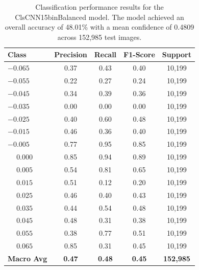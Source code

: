 \begin{table}[htbp]
\centering
\begin{tabular}{@{}lcccc@{}}
\toprule
\textbf{Class} & \textbf{Precision} & \textbf{Recall} & \textbf{F1-Score} & \textbf{Support} \\
\midrule
$-0.065$ & 0.37 & 0.43 & 0.40 & 10,199 \\
$-0.055$ & 0.22 & 0.27 & 0.24 & 10,199 \\
$-0.045$ & 0.34 & 0.39 & 0.36 & 10,199 \\
$-0.035$ & 0.00 & 0.00 & 0.00 & 10,199 \\
$-0.025$ & 0.40 & 0.60 & 0.48 & 10,199 \\
$-0.015$ & 0.46 & 0.36 & 0.40 & 10,199 \\
$-0.005$ & 0.77 & 0.95 & 0.85 & 10,199 \\
$\phantom{-}0.000$ & 0.85 & 0.94 & 0.89 & 10,199 \\
$\phantom{-}0.005$ & 0.54 & 0.81 & 0.65 & 10,199 \\
$\phantom{-}0.015$ & 0.51 & 0.12 & 0.20 & 10,199 \\
$\phantom{-}0.025$ & 0.46 & 0.40 & 0.43 & 10,199 \\
$\phantom{-}0.035$ & 0.44 & 0.54 & 0.48 & 10,199 \\
$\phantom{-}0.045$ & 0.48 & 0.31 & 0.38 & 10,199 \\
$\phantom{-}0.055$ & 0.38 & 0.77 & 0.51 & 10,199 \\
$\phantom{-}0.065$ & 0.85 & 0.31 & 0.45 & 10,199 \\
\midrule
\textbf{Macro Avg} & \textbf{0.47} & \textbf{0.48} & \textbf{0.45} & \textbf{152,985} \\
\bottomrule
\end{tabular}
\caption{Classification performance results for the ClsCNN15binBalanced model. The model achieved an overall accuracy of 48.01\% with a mean confidence of 0.4809 across 152,985 test images.}
\label{tab:clf_report_ClsCNN15binBalanced}
\end{table}

